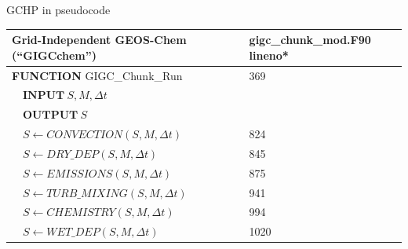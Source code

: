 \documentclass[10pt]{beamer}
\begin{document}
\begin{frame}[fragile]{GCHP in pseudocode}

    \scriptsize
    \setlength{\tabcolsep}{20pt}
    \begin{table}[]
    \begin{tabular}{ll}
    \hline
    \textbf{Grid-Independent GEOS-Chem (``GIGCchem'')} & \textbf{gigc\_chunk\_mod.F90 lineno}* \\ \hline
    \textbf{FUNCTION}   GIGC\_Chunk\_Run & 369 \\
    $\quad \textbf{INPUT}\ S, M, \Delta t$ &  \\
    $\quad \textbf{OUTPUT}\ S $ & \\
    $\quad S \leftarrow CONVECTION(S, M, \Delta t)$ & 824 \\
    $\quad S \leftarrow DRY\_DEP(S, M, \Delta t)$ & 845 \\
    $\quad S \leftarrow EMISSIONS(S, M, \Delta t)$ & 875 \\
    $\quad S \leftarrow TURB\_MIXING(S, M, \Delta t)$ & 941 \\
    $\quad S \leftarrow CHEMISTRY(S, M, \Delta t)$& 994 \\
    $\quad S \leftarrow WET\_DEP(S, M, \Delta t)$ & 1020 \\
    

\end{tabular}
\end{table}
\end{frame}
\end{document}
